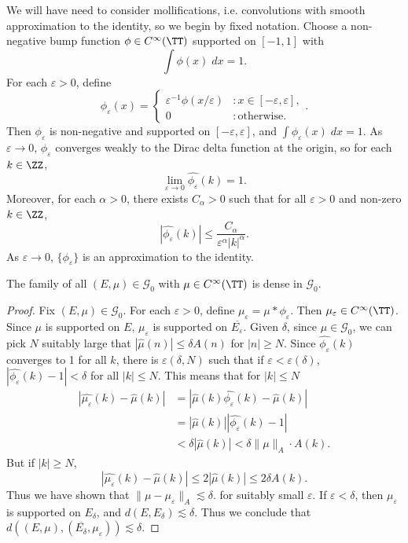 We will have need to consider mollifications, i.e. convolutions with smooth approximation to the identity, so we begin by fixed notation. Choose a non-negative bump function $\phi \in C^\infty(\TT)$ supported on $[-1,1]$ with
%
\[ \int \phi(x)\; dx = 1. \]
%
For each $\varepsilon > 0$, define
%
\[ \phi_\varepsilon(x) = \begin{cases} \varepsilon^{-1} \phi(x/\varepsilon) &: x \in [-\varepsilon, \varepsilon], \\ 0 &: \text{otherwise}. \end{cases}. \]
%
Then $\phi_\varepsilon$ is non-negative and supported on $[-\varepsilon,\varepsilon]$, and $\int \phi_\varepsilon(x)\; dx = 1$. As $\varepsilon \to 0$, $\phi_\varepsilon$ converges weakly to the Dirac delta function at the origin, so for each $k \in \ZZ$,
%
\[ \lim_{\varepsilon \to 0} \widehat{\phi_\varepsilon}(k) = 1. \]
%
Moreover, for each $\alpha > 0$, there exists $C_\alpha > 0$ such that for all $\varepsilon > 0$ and non-zero $k \in \ZZ$,
%
\[ |\widehat{\phi_\varepsilon}(k)| \leq \frac{C_\alpha}{\varepsilon^\alpha |k|^\alpha}. \]
%
As $\varepsilon \to 0$, $\{ \phi_\varepsilon \}$ is an approximation to the identity.

\begin{lemma}
	The family of all $(E,\mu) \in \mathcal{G}_0$ with $\mu \in C^\infty(\TT)$ is dense in $\mathcal{G}_0$.
\end{lemma}
\begin{proof}
	Fix $(E,\mu) \in \mathcal{G}_0$. For each $\varepsilon > 0$, define $\mu_\varepsilon = \mu * \phi_\varepsilon$. Then $\mu_\varepsilon \in C^\infty(\TT)$. Since $\mu$ is supported on $E$, $\mu_\varepsilon$ is supported on $\overline{E_\varepsilon}$. Given $\delta$, since $\mu \in \mathcal{G}_0$, we can pick $N$ suitably large that $|\widehat{\mu}(n)| \leq \delta A(n)$ for $|n| \geq N$. Since $\widehat{\phi_\varepsilon}(k)$ converges to 1 for all $k$, there is $\varepsilon(\delta,N)$ such that if $\varepsilon < \varepsilon(\delta)$, $|\widehat{\phi_\varepsilon}(k) - 1| < \delta$ for all $|k| \leq N$. This means that for $|k| \leq N$
	\begin{align*}
		|\widehat{\mu_\varepsilon}(k) - \widehat{\mu}(k)| &= |\widehat{\mu}(k) \widehat{\phi_\varepsilon}(k) - \widehat{\mu}(k)|\\
		&= |\widehat{\mu}(k)| |\widehat{\phi_\varepsilon}(k) - 1|\\
		&< \delta |\widehat{\mu}(k)| < \delta \| \mu \|_A \cdot A(k).
	\end{align*}
	But if $|k| \geq N$,
	\[ |\widehat{\mu_\varepsilon}(k) - \widehat{\mu}(k)| \leq 2 |\widehat{\mu}(k)| \leq 2 \delta A(k). \]
	Thus we have shown that $\| \mu - \mu_\varepsilon \|_A \lesssim \delta$. for suitably small $\varepsilon$. If $\varepsilon < \delta$, then $\mu_\varepsilon$ is supported on $E_\delta$, and $d(E,E_\delta) \lesssim \delta$. Thus we conclude that $d((E,\mu), (\overline{E_\delta},\mu_\varepsilon)) \lesssim \delta$.
\end{proof}

